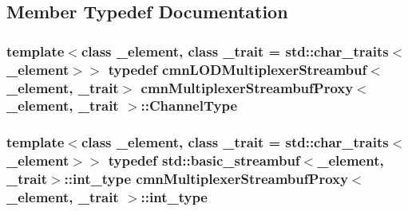 \subsection{Member Typedef Documentation}
\hypertarget{classcmn_multiplexer_streambuf_proxy_aad26781c796870ad583a690f1d4132bb}{
\subsubsection[{Channel\-Type}]{\setlength{\rightskip}{0pt plus 5cm}template$<$class \-\_\-element, class \-\_\-trait = std\-::char\-\_\-traits$<$\-\_\-element$>$$>$ typedef {\bf cmn\-L\-O\-D\-Multiplexer\-Streambuf}$<$\-\_\-element, \-\_\-trait$>$ {\bf cmn\-Multiplexer\-Streambuf\-Proxy}$<$ \-\_\-element, \-\_\-trait $>$\-::{\bf Channel\-Type}}}\label{classcmn_multiplexer_streambuf_proxy_aad26781c796870ad583a690f1d4132bb}
\hypertarget{classcmn_multiplexer_streambuf_proxy_ac600a28e3e3c860fc54ca7e7931bc6df}{
\subsubsection[{int\-\_\-type}]{\setlength{\rightskip}{0pt plus 5cm}template$<$class \-\_\-element, class \-\_\-trait = std\-::char\-\_\-traits$<$\-\_\-element$>$$>$ typedef std\-::basic\-\_\-streambuf$<$\-\_\-element, \-\_\-trait$>$\-::{\bf int\-\_\-type} {\bf cmn\-Multiplexer\-Streambuf\-Proxy}$<$ \-\_\-element, \-\_\-trait $>$\-::{\bf int\-\_\-type}}}\label{classcmn_multiplexer_streambuf_proxy_ac600a28e3e3c860fc54ca7e7931bc6df}


